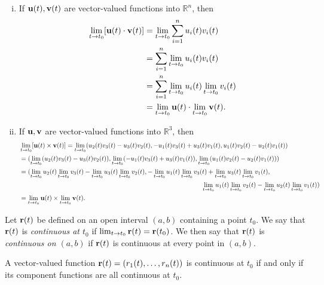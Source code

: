 \documentclass[12pt,letterpaper,reqno]{article}
\numberwithin{equation}{section}
\newcommand{\R}{\ensuremath{\mathbb R}}
\newcommand{\bu}{{\bf u}}
\newcommand{\bv}{{\bf v}}
\newcommand{\bbr}{{\bf r}}
\newcommand{\fixme}[1]{{\color{orange}{[#1]}}}
\begin{document}
{\begin{pf}
\begin{enumerate}[(i)]
	\item If $\bu(t),\bv(t)$ are vector-valued functions into $\R^n$, then
	\begin{align*}
		\lim_{t \to t_0}[\bu(t)\cdot\bv(t)]&=\lim_{t \to t_0} \sum_{i=1}^n u_i(t)v_i(t)\\
		&=\sum_{i=1}^n \lim_{t \to t_0} u_i(t)v_i(t)\\
		&=\sum_{i=1}^n \lim_{t \to t_0} u_i(t) \lim_{t \to t_0} v_i(t)\\
		&=\lim_{t \to t_0} \bu(t) \cdot \lim_{t \to t_0} \bv(t). 
	\end{align*}
	\item If $\bu,\bv$ are vector-valued functions into $\R^3$, then
	\begin{align*}
		&\lim_{t \to t_0}[\bu(t)\times\bv(t)]=\lim_{t \to t_0}(u_2(t)v_3(t)-u_3(t)v_2(t),-u_1(t)v_3(t)+u_3(t)v_1(t),u_1(t)v_2(t)-u_2(t)v_1(t)) \\
		&=(\lim_{t \to t_0}(u_2(t)v_3(t)-u_3(t)v_2(t)),\lim_{t \to t_0}(-u_1(t)v_3(t)+u_3(t)v_1(t)),\lim_{t \to t_0}(u_1(t)v_2(t)-u_2(t)v_1(t))) \\
		&=(\lim_{t \to t_0}u_2(t)\lim_{t \to t_0}v_3(t)-\lim_{t \to t_0}u_3(t)\lim_{t \to t_0}v_2(t),-\lim_{t \to t_0}u_1(t)\lim_{t \to t_0}v_3(t)+\lim_{t \to t_0}u_3(t)\lim_{t \to t_0}v_1(t), \\
		& \hspace{10cm}\lim_{t \to t_0}u_1(t)\lim_{t \to t_0}v_2(t)-\lim_{t \to t_0}u_2(t)\lim_{t \to t_0}v_1(t)) \\
		&=\lim_{t \to t_0}\bu(t)\times\lim_{t \to t_0}\bv(t).
	\end{align*}
\end{enumerate}
\end{pf}

\fixme{Add examples.}

\begin{defn}[Continuity]
	Let $\bbr(t)$ be defined on an open interval $(a,b)$ containing a point $t_0$. We say that $\bbr(t)$ is \emph{continuous at $t_0$} if $\lim_{t \to t_0}\bbr(t)=\bbr(t_0)$. We then say that $\bbr(t)$ is \emph{continuous on $(a,b)$} if $\bbr(t)$ is continuous at every point in $(a,b)$.
\end{defn}

\begin{thm}
	A vector-valued function $\bbr(t)=(r_1(t),\dots,r_n(t))$ is continuous at $t_0$ if and only if its component functions are all continuous at $t_0$.
\end{thm}

}
\end{document}
